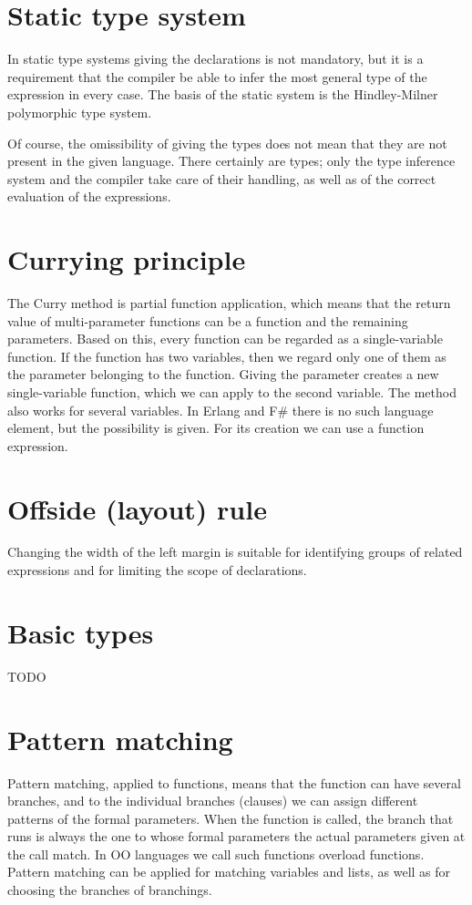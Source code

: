 \documentclass[margin=0px]{article}
\begin{document}
\section{Static type system}
In static type systems giving the declarations is not mandatory, but it is a requirement that the compiler be able to infer the most general type of the expression in every case. The basis of the static system is the Hindley-Milner polymorphic type system.

Of course, the omissibility of giving the types does not mean that they are not present in the given language. There certainly are types; only the type inference system and the compiler take care of their handling, as well as of the correct evaluation of the expressions.

\section{Currying principle}
The Curry method is partial function application, which means that the return value of multi-parameter functions can be a function and the remaining parameters. Based on this, every function can be regarded as a single-variable function. If the function has two variables, then we regard only one of them as the parameter belonging to the function. Giving the parameter creates a new single-variable function, which we can apply to the second variable. The method also works for several variables. In Erlang and F\# there is no such language element, but the possibility is given. For its creation we can use a function expression.

\section{Offside (layout) rule}
Changing the width of the left margin is suitable for identifying groups of related expressions and for limiting the scope of declarations.

\section{Basic types}
TODO

\section{Pattern matching}
Pattern matching, applied to functions, means that the function can have several branches, and to the individual branches (clauses) we can assign different patterns of the formal parameters. When the function is called, the branch that runs is always the one to whose formal parameters the actual parameters given at the call match. In OO languages we call such functions overload functions. Pattern matching can be applied for matching variables and lists, as well as for choosing the branches of branchings.
\end{document}
